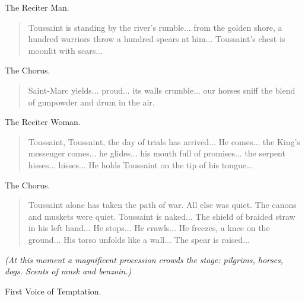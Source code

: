 \documentclass[letterpaper,article,12pt,oneside,notitlepage]{memoir}
\begin{document}
\begin{center}The Reciter Man.\end{center}

\begin{verse}
\indent Toussaint is standing by the river's rumble... from the golden shore, a hundred warriors throw a hundred spears at him... Toussaint's chest is moonlit with scars... \\
\end{verse}

\begin{center}The Chorus.\end{center}

\begin{verse}
\indent Saint-Marc yields... proud... its walls crumble... our horses sniff the blend of gunpowder and drum in the air. \\
\end{verse}

\begin{center}The Reciter Woman.\end{center}

\begin{verse}
\indent Toussaint, Toussaint, the day of trials has arrived... He comes... the King's messenger comes... he glides... his mouth full of promises... the serpent hisses... hisses... He holds Toussaint on the tip of his tongue... \\
\end{verse}

\begin{center}The Chorus.\end{center}

\begin{verse}
\indent Toussaint alone has taken the path of war. All else was quiet. The canons and muskets were quiet. Toussaint is naked... The shield of braided straw in his left hand... He stops... He crawls... He freezes, a knee on the ground... His torso unfolds like a wall... The spear is raised... \\
\end{verse}

\textit{(At this moment a magnificent procession crowds the stage: pilgrims, horses, dogs. Scents of musk and benzoin.)}

\begin{center}First Voice of Temptation.\end{center}
\end{document}
